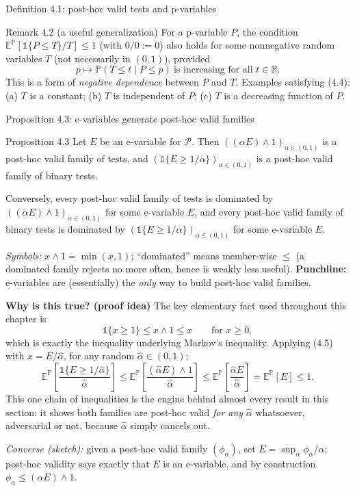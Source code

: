 \documentclass[aspectratio=169,10pt]{beamer}
\begin{document}
\begin{frame}[allowframebreaks]{Definition 4.1: post-hoc valid tests and p-variables}
  \begin{block}{Remark 4.2 (a useful generalization)}
    For a p-variable $P$, the condition $\mathbb E^{\mathbb P}[\mathbb 1\{P\le T\}/T]\le 1$
    (with $0/0:=0$) also holds for some nonnegative random variables $T$ (not
    necessarily in $(0,1)$), provided
    \[
      p\mapsto \mathbb P(T\le t\mid P\le p)\ \text{is increasing for all } t\in\mathbb R. \tag{4.4}
    \]
    This is a form of \emph{negative dependence} between $P$ and $T$.
    Examples satisfying (4.4): (a) $T$ is a constant; (b) $T$ is independent
    of $P$; (c) $T$ is a decreasing function of $P$.
  \end{block}
\end{frame}

\begin{frame}[allowframebreaks]{Proposition 4.3: e-variables generate post-hoc valid families}
  \begin{block}{Proposition 4.3}
    Let $E$ be an e-variable for $\mathcal P$. Then $((\alpha E)\wedge 1)_{\alpha\in(0,1)}$
    is a post-hoc valid family of tests, and $(\mathbb 1\{E\ge 1/\alpha\})_{\alpha\in(0,1)}$
    is a post-hoc valid family of binary tests.

    \smallskip
    Conversely, every post-hoc valid family of tests is dominated by
    $((\alpha E)\wedge 1)_{\alpha\in(0,1)}$ for some e-variable $E$, and every
    post-hoc valid family of binary tests is dominated by
    $(\mathbb 1\{E\ge 1/\alpha\})_{\alpha\in(0,1)}$ for some e-variable $E$.
  \end{block}
  \emph{Symbols:} $x\wedge 1 = \min(x,1)$; ``dominated'' means member-wise
  $\le$ (a dominated family rejects no more often, hence is weakly less
  useful). \textbf{Punchline:} e-variables are (essentially) the
  \emph{only} way to build post-hoc valid families.

  \framebreak

  \textbf{Why is this true? (proof idea)} The key elementary fact used
  throughout this chapter is
  \[
    \mathbb 1\{x\ge 1\} \le x\wedge 1 \le x \qquad \text{for } x\ge 0, \tag{4.5}
  \]
  which is exactly the inequality underlying Markov's inequality. Applying
  (4.5) with $x = E/\hat\alpha$, for any random $\hat\alpha\in(0,1)$:
  \[
    \mathbb E^{\mathbb P}\!\left[\frac{\mathbb 1\{E\ge 1/\hat\alpha\}}{\hat\alpha}\right]
    \le \mathbb E^{\mathbb P}\!\left[\frac{(\hat\alpha E)\wedge 1}{\hat\alpha}\right]
    \le \mathbb E^{\mathbb P}\!\left[\frac{\hat\alpha E}{\hat\alpha}\right]
    = \mathbb E^{\mathbb P}[E] \le 1.
  \]
  This one chain of inequalities is the engine behind almost every result in
  this section: it shows both families are post-hoc valid \emph{for any}
  $\hat\alpha$ whatsoever, adversarial or not, because $\hat\alpha$ simply
  cancels out.

  \textit{Converse (sketch):} given a post-hoc valid family
  $(\phi_\alpha)$, set $E=\sup_\alpha \phi_\alpha/\alpha$; post-hoc validity
  says exactly that $E$ is an e-variable, and by construction
  $\phi_\alpha\le(\alpha E)\wedge 1$.
\end{frame}
\end{document}
